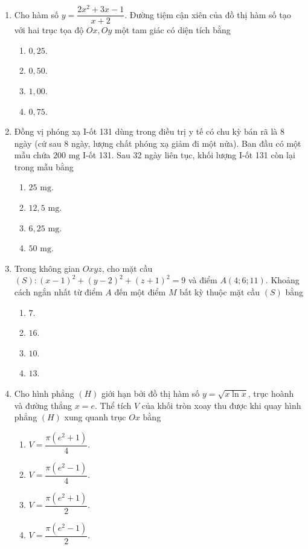 \documentclass[12pt,a4paper]{article}
\begin{document}
\begin{enumerate}[label=\textbf{Câu \arabic*:}, leftmargin=*]
\item Cho hàm số $y = \dfrac{2x^2 + 3x - 1}{x + 2}$. Đường tiệm cận xiên của đồ thị hàm số tạo với hai trục tọa độ $Ox, Oy$ một tam giác có diện tích bằng
\begin{enumerate}[label=\Alph*.]
    \item $0{,}25$.
    \item $0{,}50$.
    \item $1{,}00$.
    \item $0{,}75$.
\end{enumerate}

\item Đồng vị phóng xạ I-ốt 131 dùng trong điều trị y tế có chu kỳ bán rã là 8 ngày (cứ sau 8 ngày, lượng chất phóng xạ giảm đi một nửa). Ban đầu có một mẫu chứa $200\text{ mg}$ I-ốt 131. Sau 32 ngày liên tục, khối lượng I-ốt 131 còn lại trong mẫu bằng
\begin{enumerate}[label=\Alph*.]
    \item $25\text{ mg}$.
    \item $12{,}5\text{ mg}$.
    \item $6{,}25\text{ mg}$.
    \item $50\text{ mg}$.
\end{enumerate}

\item Trong không gian $Oxyz$, cho mặt cầu $(S): (x - 1)^2 + (y - 2)^2 + (z + 1)^2 = 9$ và điểm $A(4; 6; 11)$. Khoảng cách ngắn nhất từ điểm $A$ đến một điểm $M$ bất kỳ thuộc mặt cầu $(S)$ bằng
\begin{enumerate}[label=\Alph*.]
    \item $7$.
    \item $16$.
    \item $10$.
    \item $13$.
\end{enumerate}

\item Cho hình phẳng $(H)$ giới hạn bởi đồ thị hàm số $y = \sqrt{x \ln x}$, trục hoành và đường thẳng $x = e$. Thể tích $V$ của khối tròn xoay thu được khi quay hình phẳng $(H)$ xung quanh trục $Ox$ bằng
\begin{enumerate}[label=\Alph*.]
    \item $V = \dfrac{\pi(e^2 + 1)}{4}$.
    \item $V = \dfrac{\pi(e^2 - 1)}{4}$.
    \item $V = \dfrac{\pi(e^2 + 1)}{2}$.
    \item $V = \dfrac{\pi(e^2 - 1)}{2}$.
\end{enumerate}


\end{enumerate}
\end{document}
